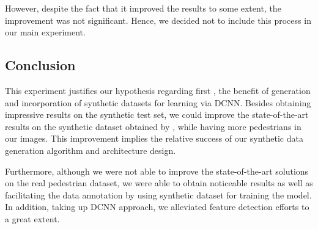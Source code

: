 However, despite the fact that it improved the results to some extent, the improvement was not significant. Hence, we decided not to include this process in our main experiment. 
%
%
%

\subsection{Conclusion}

This experiment justifies our hypothesis regarding first , the benefit of generation and incorporation of synthetic datasets for learning via DCNN. Besides obtaining impressive results on the synthetic test set, we could improve the state-of-the-art results on the synthetic dataset obtained by \citet{segui2015learning}, while having more pedestrians in our images. This improvement implies the relative success of our synthetic data generation algorithm and architecture design.

Furthermore, although we were not able to improve the state-of-the-art solutions on the real pedestrian dataset, we were able to obtain noticeable results as well as facilitating the data annotation by using synthetic dataset for training the model. In addition, taking up DCNN approach, we alleviated feature detection efforts to a great extent. 

